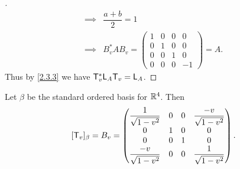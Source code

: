 \begin{proof}[]
\begin{align*}
    \implies & \dfrac{a + b}{2} = 1                                                  \\
    \implies & B_v^* A B_v = \begin{pmatrix}
                               1 & 0 & 0 & 0  \\
                               0 & 1 & 0 & 0  \\
                               0 & 0 & 1 & 0  \\
                               0 & 0 & 0 & -1
                             \end{pmatrix} = A.
  \end{align*}
  Thus by \cref{2.3.3} we have \(\mathsf{T}_v^* \mathsf{L}_A \mathsf{T}_v = \mathsf{L}_A\).
\end{proof}

\begin{thm}\label{6.42}
  Let \(\beta\) be the standard ordered basis for \(\mathbb{R}^4\).
  Then
  \[
    [\mathsf{T}_v]_{\beta} = B_v = \begin{pmatrix}
      \dfrac{1}{\sqrt{1 - v^2}}  & 0 & 0 & \dfrac{-v}{\sqrt{1 - v^2}} \\
      0                          & 1 & 0 & 0                          \\
      0                          & 0 & 1 & 0                          \\
      \dfrac{-v}{\sqrt{1 - v^2}} & 0 & 0 & \dfrac{1}{\sqrt{1 - v^2}}
    \end{pmatrix}.
  \]
\end{thm}

